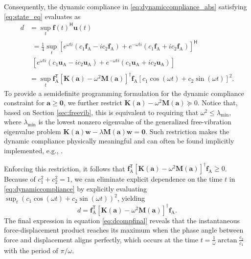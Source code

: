 \documentclass[preprint,3p]{elsarticle}
\newcommand{\T}{^{\mathsf T}}
\newcommand{\TC}{^{\mathsf H}}
\newcommand{\A}{\mathrm{A}}
\numberwithin{equation}{section}
\begin{document}
Consequently, the dynamic compliance in \eqref{eq:dynamiccompliance_abs} satisfying \eqref{eq:state_eq} evaluates as
%
\begin{equation}\label{eq:dynamiccompliance}
  \begin{aligned}
    d &= \sup_{t} \mathbf{f}(t)\TC \mathbf{u}(t)\\
    &
    \begin{multlined}
      = \frac{1}{4} \sup_{t} \left[e^{\omega t i}(c_1 \mathbf{f}_\A - i c_2 \mathbf{f}_\A) + e^{-\omega t i}( c_1 \mathbf{f}_\A + i c_2 \mathbf{f}_\A)\right]\TC\\
      \left[ e^{\omega t i}(c_1 \mathbf{u}_\A - i c_2 \mathbf{u}_\A) + e^{-\omega t i}( c_1 \mathbf{u}_\A + i c_2 \mathbf{u}_\A) \right]
    \end{multlined}\\
    &= \sup_{t} \mathbf{f}_\A\T \left[ \mathbf{K}(\mathbf{a}) - \omega^2 \mathbf{M}(\mathbf{a})\right]^\dagger \mathbf{f}_\A \left[c_1 \cos(\omega t) + c_2 \sin(\omega t)\right]^2.
  \end{aligned}
\end{equation}
%
To provide a semidefinite programming formulation for the dynamic compliance constraint for $\mathbf{a}\ge \mathbf{0}$, we further restrict $\mathbf{K}(\mathbf{a}) - \omega^2 \mathbf{M}(\mathbf{a}) \succeq 0$. Notice that, based on Section \ref{sec:freevib}, this is equivalent to requiring that $\omega^2 \le \lambda_{\min}$, where $\lambda_{\min}$ is the lowest nonzero eigenvalue of the generalized free-vibration eigenvalue problem $\mathbf{K}(\mathbf{a}) \mathbf{w} - \lambda \mathbf{M}(\mathbf{a})\mathbf{w} = \mathbf{0}$. Such restriction makes the dynamic compliance physically meaningful \citep{Silva2019} and can often be found implicitly implemented, e.g., \citep{Olhoff2016}.

Enforcing this restriction, it follows that $\mathbf{f}_\A\T \left[ \mathbf{K}(\mathbf{a}) - \omega^2 \mathbf{M}(\mathbf{a})\right]^\dagger \mathbf{f}_\A \ge 0$. Because of $c_1^2+c_2^2=1$, we can eliminate explicit dependence on the time $t$ in \eqref{eq:dynamiccompliance} by explicitly evaluating $\sup_t (c_1 \cos(\omega t) + c_2 \sin(\omega t))^2$, yielding
%
\begin{equation}\label{eq:dcompfinal}
  d = \mathbf{f}_\A\T \left[ \mathbf{K}(\mathbf{a}) - \omega^2 \mathbf{M}(\mathbf{a})\right]^\dagger \mathbf{f}_\A.
\end{equation}
%
The final expression in equation \eqref{eq:dcompfinal} reveals that the instantaneous force-displacement product reaches its maximum when the phase angle between force and displacement aligns perfectly, which occurs at the time $t = \frac{1}{\omega} \arctan \frac{c_2}{c_1}$ with the period of $\pi/\omega$.
\end{document}
